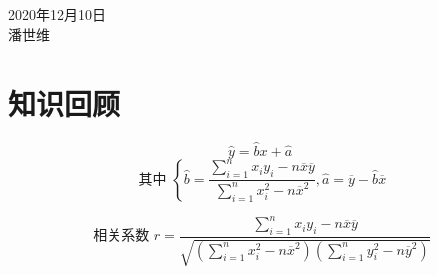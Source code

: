 \documentclass[UTF8]{article}
\begin{document}
   
\begin{center}
{}
\\ \hspace*{\fill} \\ 2020年12月10日
\\潘世维\\
\end{center}
\section{知识回顾}  

$$\hat { y } = \hat { b } x + \hat { a }$$ 
$$\text { 其中 } \left\{\hat { b } = \frac { \sum\limits _ { i = 1 } ^ { n } x _ { i } y _ { i } - n \overline { x } \overline { y } } { \sum \limits_ { i = 1 } ^ { n } x _ { i } ^ { 2 } - n \overline { x } ^ { 2 } } , \hat { a } = \overline { y } - \hat { b } \overline { x } \right.$$

$$\text { 相关系数 }r = \frac { \sum \limits_ { i = 1 } ^ { n } x _ { i } y _ { i } - n \overline { x } \overline { y } } { \sqrt { ( \sum \limits_ { i = 1 } ^ { n } x _ { i } ^ { 2 } - n \overline { x } ^ { 2 } ) ( \sum \limits_ { i = 1 } ^ { n } y _ { i } ^ { 2 } - n \overline { y } ^ { 2 } ) } } $$
\\
\end{document}

